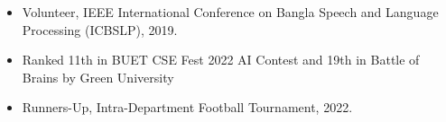 
\begin{extraCurriculars}
	\extraCurricular
        {
        \begin{itemize}
            \item Volunteer, IEEE International Conference on Bangla Speech and Language Processing (ICBSLP), 2019.
            \item Ranked 11th in BUET CSE Fest 2022 AI Contest and 19th in Battle of Brains by Green University
            \item Runners-Up, Intra-Department Football Tournament, 2022.
        \end{itemize}
        }
\end{extraCurriculars}